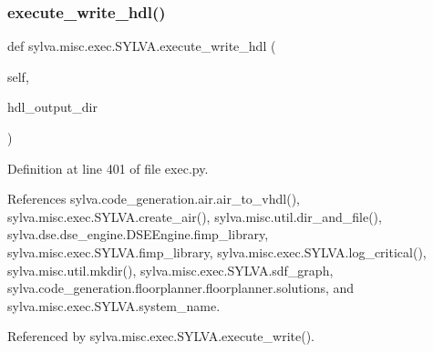 \subsubsection{\texorpdfstring{execute\+\_\+write\+\_\+hdl()}{execute\_write\_hdl()}}
{\footnotesize\ttfamily def sylva.\+misc.\+exec.\+S\+Y\+L\+V\+A.\+execute\+\_\+write\+\_\+hdl (\begin{DoxyParamCaption}\item[{}]{self,  }\item[{}]{hdl\+\_\+output\+\_\+dir }\end{DoxyParamCaption})}



Definition at line 401 of file exec.\+py.



References sylva.\+code\+\_\+generation.\+air.\+air\+\_\+to\+\_\+vhdl(), sylva.\+misc.\+exec.\+S\+Y\+L\+V\+A.\+create\+\_\+air(), sylva.\+misc.\+util.\+dir\+\_\+and\+\_\+file(), sylva.\+dse.\+dse\+\_\+engine.\+D\+S\+E\+Engine.\+fimp\+\_\+library, sylva.\+misc.\+exec.\+S\+Y\+L\+V\+A.\+fimp\+\_\+library, sylva.\+misc.\+exec.\+S\+Y\+L\+V\+A.\+log\+\_\+critical(), sylva.\+misc.\+util.\+mkdir(), sylva.\+misc.\+exec.\+S\+Y\+L\+V\+A.\+sdf\+\_\+graph, sylva.\+code\+\_\+generation.\+floorplanner.\+floorplanner.\+solutions, and sylva.\+misc.\+exec.\+S\+Y\+L\+V\+A.\+system\+\_\+name.



Referenced by sylva.\+misc.\+exec.\+S\+Y\+L\+V\+A.\+execute\+\_\+write().


